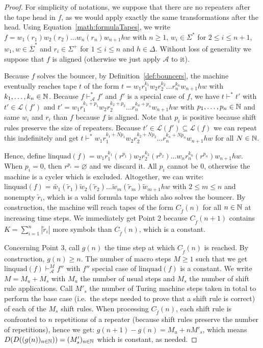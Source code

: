 \begin{proof}
    For simplicity of notations, we suppose that there are no repeaters after the tape head in $f$, as we would apply exactly the same transformations after the head. Using Equation~\eqref{math:formulaTapes}, we write $f=w_1(r_1)w_2(r_2)\dots w_n(r_n) w_{n+1} h w$ with $n \geq 1$, $w_i \in \Sigma^*$ for $2 \leq i \leq n+1$, $w_1,w \in \overline{\Sigma}^*$ and $r_i \in \Sigma^+$ for $1 \leq i \leq n$ and $h\in\Delta$. Without loss of generality we suppose that $f$ is aligned (otherwise we just apply $\mathcal{A}$ to it).

    Because $f$ solves the bouncer, by Definition~\ref{def:bouncers}, the machine eventually reaches tape $t$ of the form $t = w_1 r_1^{k_1} w_2 r_2^{k_2} \dots r_n^{k_n} w_{n+1} h w$ with $k_1, \dots, k_n \in \mathbb{N}$. Because $f \vdash_\mathcal{A}^* f'$ and $f'$ is a special case of $f$, we have $t \vdash^* t'$ with $t' \in \mathcal{L}(f')$ and $t' = w_1 r_1^{k_1 + p_1} w_2 r_2^{k_2 + p_2} \dots r_n^{k_n + p_n} w_{n+1} h w$ with $p_1, \dots, p_n \in \mathbb{N}$ and same $w_i$ and $r_i$ than $f$ because $f$ is aligned. Note that $p_i$ is positive because shift rules preserve the size of repeaters. Because $t'\in\mathcal{L}(f') \subseteq \mathcal{L}(f)$ we can repeat this indefinitely and get $t \vdash^* w_1 r_1^{k_1 + Np_1} w_2 r_2^{k_2 + Np_2} \dots r_n^{k_n + Np_n} w_{n+1} h w$ for all $N \in \mathbb{N}$.

    Hence, define $\text{linquad}(f) = w_1 r_1^{k_1} (r^{p_1}) w_2 r_2^{k_2} (r^{p_2}) \dots w_n r_n^{k_n} (r^{p_n}) w_{n+1} h w$. When $p_i=0$, then $r^{p_i} = \varnothing$ and we discard it. All $p_i$ cannot be $0$, otherwise the machine is a cycler which is excluded. Altogether, we can write: $\text{linquad}(f) = \tilde{w_1} (\tilde{r}_1) \tilde{w}_2 (\tilde{r}_2) \dots \tilde{w}_m (\tilde{r}_m) \tilde{w}_{m+1} h w$ with $2 \leq m \leq n$ and nonempty $\tilde{r}_i$, which is a valid formula tape which also solves the bouncer. By construction, the machine will reach tapes of the form $C_{\tilde{f}}(n)$ for all $n\in\mathbb{N}$ at increasing time steps. We immediately get Point 2 because $C_{\tilde{f}}(n+1)$ contains $K = \sum_{i=1}^n |\tilde{r}_i|$ more symbols than $C_{\tilde{f}}(n)$, which is a constant.

    Concerning Point 3, call $g(n)$ the time step at which $C_{\tilde{f}}(n)$ is reached. By construction, $g(n) \geq n$. The number of macro steps $M \geq 1$ such that we get $\text{linquad}(f) \vdash_\mathcal{A}^M f''$ with $f''$ special case of $\text{linquad}(f)$ is a constant. We write $M = M_u + M_s$ with $ M_u$ the number of usual steps and $M_s$ the number of shift rule applications. Call $M'_s$ the number of Turing machine steps taken in total to perform the base case (i.e.\ the steps needed to prove that a shift rule is correct) of each of the $M_s$ shift rules. When processing $C_{\tilde{f}}(n)$, each shift rule is confronted to $n$ repetitions of a repeater (because shift rules preserve the number of repetitions), hence we get: $g(n+1) - g(n) = M_u + n M'_s$, which means $D(D((g(n))_{n\in\mathbb{N}})) = (M'_s)_{n\in\mathbb{N}}$ which is constant, as needed.

\end{proof}

